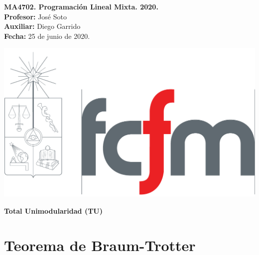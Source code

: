 \documentclass[10pt]{article}
\theoremstyle{plain}
\theoremstyle{definition}
\newcommand{\sca}{Diego Garrido}
\newcommand{\fecha}{25 de junio  de 2020}
\begin{document}
\vspace*{-1.2 cm}
\begin{minipage}{0.6\textwidth}
\begin{flushleft}
\hspace*{-0.5cm}\textbf{MA4702. Programación Lineal Mixta. 2020.}\\
\hspace*{-0.5cm}\textbf{Profesor:} José Soto\\
\hspace*{-0.5cm}\textbf{Auxiliar:} \sca\\
\hspace*{-0.5cm}\textbf{Fecha:} \fecha.
\end{flushleft}
\end{minipage}
\begin{minipage}{0.36\textwidth}
\begin{flushright}
\includegraphics[scale=0.15]{fcfm}
\end{flushright}
\end{minipage}
\bigskip

\begin{center}
\LARGE\textbf{Total Unimodularidad (TU)}
\end{center}


\section{Teorema de Braum-Trotter}
\end{document}

